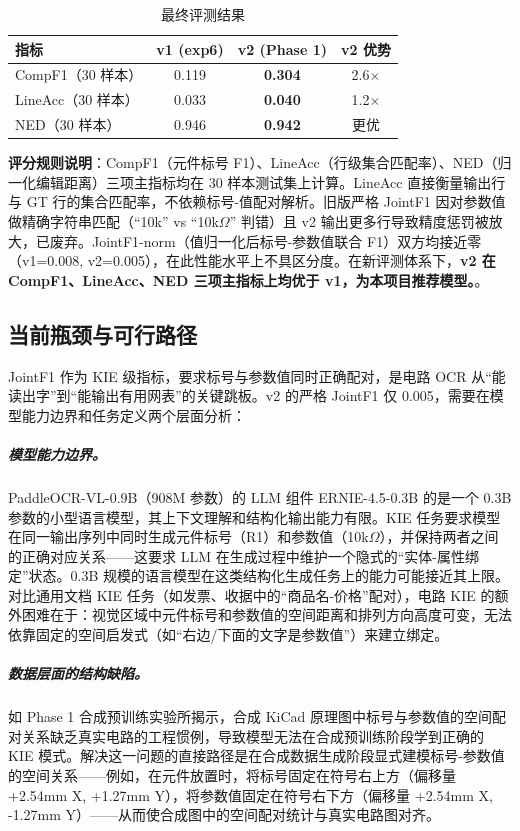 \begin{table}[h]
\centering
\caption{最终评测结果}
\begin{tabular}{lccc}
\toprule
\textbf{指标} & \textbf{v1 (exp6)} & \textbf{v2 (Phase 1)} & \textbf{v2 优势} \\
\midrule
CompF1（30 样本）    & 0.119 & \textbf{0.304} & 2.6$\times$ \\
LineAcc（30 样本）   & 0.033 & \textbf{0.040} & 1.2$\times$ \\
NED（30 样本）       & 0.946 & \textbf{0.942} & 更优 \\
\bottomrule
\end{tabular}
\end{table}

\textbf{评分规则说明}：CompF1（元件标号 F1）、LineAcc（行级集合匹配率）、NED（归一化编辑距离）三项主指标均在 30 样本测试集上计算。LineAcc 直接衡量输出行与 GT 行的集合匹配率，不依赖标号-值配对解析。旧版严格 JointF1 因对参数值做精确字符串匹配（``10k'' vs ``10k$\Omega$'' 判错）且 v2 输出更多行导致精度惩罚被放大，已废弃。JointF1-norm（值归一化后标号-参数值联合 F1）双方均接近零（v1=0.008, v2=0.005），在此性能水平上不具区分度。在新评测体系下，\textbf{v2 在 CompF1、LineAcc、NED 三项主指标上均优于 v1，为本项目推荐模型。}。

\subsection{当前瓶颈与可行路径}

JointF1 作为 KIE 级指标，要求标号与参数值同时正确配对，是电路 OCR 从``能读出字''到``能输出有用网表''的关键跳板。v2 的严格 JointF1 仅 0.005，需要在模型能力边界和任务定义两个层面分析：

\subparagraph{模型能力边界。}
PaddleOCR-VL-0.9B（908M 参数）的 LLM 组件 ERNIE-4.5-0.3B 的是一个 0.3B 参数的小型语言模型，其上下文理解和结构化输出能力有限。KIE 任务要求模型在同一输出序列中同时生成元件标号（R1）和参数值（10k$\Omega$），并保持两者之间的正确对应关系——这要求 LLM 在生成过程中维护一个隐式的``实体-属性绑定''状态。0.3B 规模的语言模型在这类结构化生成任务上的能力可能接近其上限。对比通用文档 KIE 任务（如发票、收据中的``商品名-价格''配对），电路 KIE 的额外困难在于：视觉区域中元件标号和参数值的空间距离和排列方向高度可变，无法依靠固定的空间启发式（如``右边/下面的文字是参数值''）来建立绑定。

\subparagraph{数据层面的结构缺陷。}
如 Phase 1 合成预训练实验所揭示，合成 KiCad 原理图中标号与参数值的空间配对关系缺乏真实电路的工程惯例，导致模型无法在合成预训练阶段学到正确的 KIE 模式。解决这一问题的直接路径是在合成数据生成阶段显式建模标号-参数值的空间关系——例如，在元件放置时，将标号固定在符号右上方（偏移量 +2.54mm X, +1.27mm Y），将参数值固定在符号右下方（偏移量 +2.54mm X, -1.27mm Y）——从而使合成图中的空间配对统计与真实电路图对齐。

